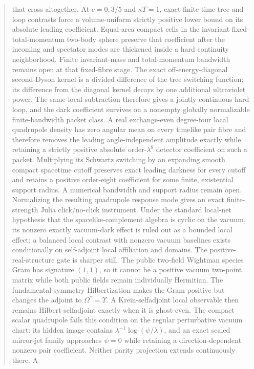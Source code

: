 \documentclass[11pt]{article}
\theoremstyle{definition}
\theoremstyle{remark}
\begin{document}
\begin{abstract}
that cross altogether.  At $c=0,3/5$ and $\kappa T=1$, exact finite-time
tree and loop contrasts force a volume-uniform strictly positive lower bound
on its absolute leading coefficient.  Equal-area compact cells in the
invariant fixed-total-momentum two-body sphere preserve that coefficient
after the incoming and spectator modes are thickened inside a hard continuity
neighborhood.  Finite invariant-mass and total-momentum bandwidth remains
open at that fixed-fibre stage.  The exact off-energy-diagonal second-Dyson
kernel is a divided difference of the tree switching function; its difference
from the diagonal kernel decays by one additional ultraviolet power.  The
same local subtraction therefore gives a jointly continuous hard loop, and
the dark coefficient survives on a nonempty globally normalizable
finite-bandwidth packet class.  A real exchange-even degree-four local
quadrupole density has zero angular mean on every timelike pair fibre and
therefore removes the leading angle-independent amplitude exactly while
retaining a strictly positive absolute order-$\lambda^8$ detector
coefficient on such a packet.  Multiplying its Schwartz switching by an
expanding smooth compact spacetime cutoff preserves exact leading darkness
for every cutoff and retains a positive order-eight coefficient for some
finite, existential support radius.  A numerical bandwidth and support
radius remain open.  Normalizing the resulting quadrupole response mode gives
an exact finite-strength Julia click/no-click instrument.  Under the standard
local-net hypothesis that the spacelike-complement algebra is cyclic on the
vacuum, its nonzero exactly vacuum-dark effect is ruled out as a bounded
local effect; a balanced local contrast with nonzero vacuum baselines exists
conditionally on self-adjoint local affiliation and domains.  The
positive-real-structure gate is sharper still.  The public two-field
Wightman species Gram has signature $(1,1)$, so it cannot be a positive
vacuum two-point matrix while both public fields remain individually
Hermitian.  The fundamental-symmetry Hilbertization makes the Gram positive
but changes the adjoint to $\Omega^*=\Upsilon$.  A Krein-selfadjoint local
observable then remains Hilbert-selfadjoint exactly when it is ghost-even.
The compact scalar quadrupole fails this condition on the regular
perturbative vacuum chart: its hidden image contains
$\lambda^{-1}\log(\psi/\lambda)$, and an exact scaled mirror-jet family
approaches $\psi=0$ while retaining a direction-dependent nonzero pair
coefficient.  Neither parity projection extends continuously there.  A

\end{abstract}
\end{document}

